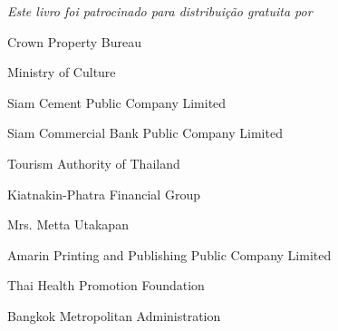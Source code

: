 \clearpage
\thispagestyle{plain}

{\centering
  
\emph{Este livro foi patrocinado para distribuição gratuita por}

\vspace*{8mm}

Crown Property Bureau

Ministry of Culture

Siam Cement Public Company Limited

Siam Commercial Bank Public Company Limited

Tourism Authority of Thailand

Kiatnakin-Phatra Financial Group

Mrs. Metta Utakapan

Amarin Printing and Publishing Public Company Limited

Thai Health Promotion Foundation

Bangkok Metropolitan Administration

}

